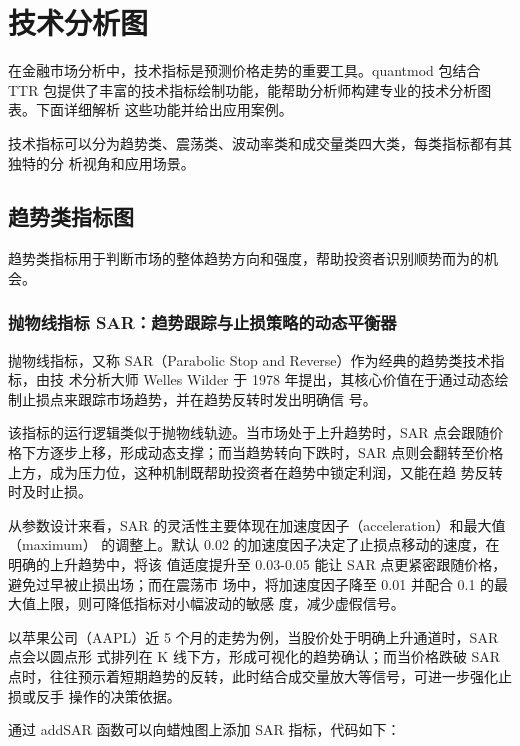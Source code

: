 \documentclass[]{ctexbook}
\begin{document}
\chapter{技术分析图}\label{TTR}

在金融市场分析中，技术指标是预测价格走势的重要工具。quantmod 包结合 TTR 包提供了丰富的技术指标绘制功能，能帮助分析师构建专业的技术分析图表。下面详细解析
这些功能并给出应用案例。

技术指标可以分为趋势类、震荡类、波动率类和成交量类四大类，每类指标都有其独特的分
析视角和应用场景。

\section{趋势类指标图}\label{ux8d8bux52bfux7c7bux6307ux6807ux56fe}

趋势类指标用于判断市场的整体趋势方向和强度，帮助投资者识别顺势而为的机会。

\subsection{抛物线指标 SAR：趋势跟踪与止损策略的动态平衡器}\label{ux629bux7269ux7ebfux6307ux6807-sarux8d8bux52bfux8ddfux8e2aux4e0eux6b62ux635fux7b56ux7565ux7684ux52a8ux6001ux5e73ux8861ux5668}

抛物线指标，又称 SAR（Parabolic Stop and Reverse）作为经典的趋势类技术指标，由技
术分析大师 Welles Wilder 于 1978 年提出，其核心价值在于通过动态绘制止损点来跟踪市场趋势，并在趋势反转时发出明确信
号。

该指标的运行逻辑类似于抛物线轨迹。当市场处于上升趋势时，SAR 点会跟随价格下方逐步上移，形成动态支撑；而当趋势转向下跌时，SAR 点则会翻转至价格上方，成为压力位，这种机制既帮助投资者在趋势中锁定利润，又能在趋
势反转时及时止损。

从参数设计来看，SAR 的灵活性主要体现在加速度因子（acceleration）和最大值（maximum）
的调整上。默认 0.02 的加速度因子决定了止损点移动的速度，在明确的上升趋势中，将该
值适度提升至 0.03-0.05 能让 SAR 点更紧密跟随价格，避免过早被止损出场；而在震荡市
场中，将加速度因子降至 0.01 并配合 0.1 的最大值上限，则可降低指标对小幅波动的敏感
度，减少虚假信号。

以苹果公司（AAPL）近 5 个月的走势为例，当股价处于明确上升通道时，SAR 点会以圆点形
式排列在 K 线下方，形成可视化的趋势确认；而当价格跌破 SAR 点时，往往预示着短期趋势的反转，此时结合成交量放大等信号，可进一步强化止损或反手
操作的决策依据。

通过 addSAR 函数可以向蜡烛图上添加 SAR 指标，代码如下：
\end{document}
